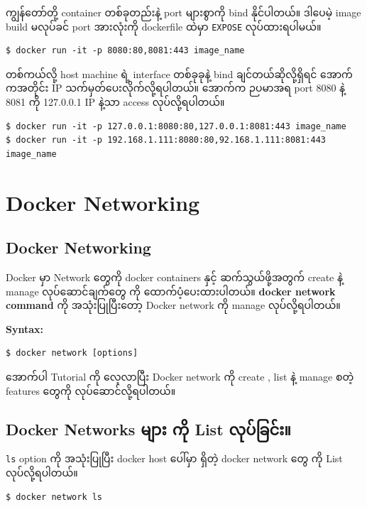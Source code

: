 \documentclass{article}
\begin{document}
ကျွန်တော်တို့ container တစ်ခုတည်းနဲ့ port များစွာကို bind နိုင်ပါတယ်။
ဒါပေမဲ့ image build မလုပ်ခင် port အားလုံးကို dockerfile ထဲမှာ
\texttt{EXPOSE} လုပ်ထားရပါမယ်။

\begin{verbatim}
$ docker run -it -p 8080:80,8081:443 image_name
\end{verbatim}

တစ်ကယ်လို့ host machine ရဲ့ interface တစ်ခုခုနဲ့ bind
ချင်တယ်ဆိုလို့ရှိရင် အောက်ကအတိုင်း IP သက်မှတ်ပေးလိုက်လို့ရပါတယ်။ အောက်က
ဉပမာအရ port 8080 နဲ့ 8081 ကို 127.0.0.1 IP နဲ့သာ access လုပ်လို့ရပါတယ်။

\begin{verbatim}
$ docker run -it -p 127.0.0.1:8080:80,127.0.0.1:8081:443 image_name
$ docker run -it -p 192.168.1.111:8080:80,92.168.1.111:8081:443 image_name
\end{verbatim}

\section{Docker Networking}\label{docker-networking}

\subsection{Docker Networking}\label{docker-networking-1}

Docker မှာ Network တွေကို docker containers နှင့် ဆက်သွယ်ဖို့အတွက်
create နဲ့ manage လုပ်ဆောင်ချက်တွေ ကို ထောက်ပံ့ပေးထားပါတယ်။
\textbf{docker network command} ကို အသုံးပြုပြီးတော့ Docker network ကို
manage လုပ်လို့ရပါတယ်။

\textbf{Syntax:}

\begin{verbatim}
$ docker network [options]
\end{verbatim}

အောက်ပါ Tutorial ကို လေ့လာပြီး Docker network ကို create , list နဲ့
manage စတဲ့ features တွေကို လုပ်ဆောင်လို့ရပါတယ်။

\subsection{Docker Networks များ ကို List
လုပ်ခြင်း။}\label{docker-networks-ux1019-ux1000-list-ux101cux1015ux1001ux1004}

\texttt{ls} option ကို အသုံးပြုပြီး docker host ပေါ်မှာ ရှိတဲ့ docker
network တွေ ကို List လုပ်လို့ရပါတယ်။

\begin{verbatim}
$ docker network ls
\end{verbatim}
\end{document}
